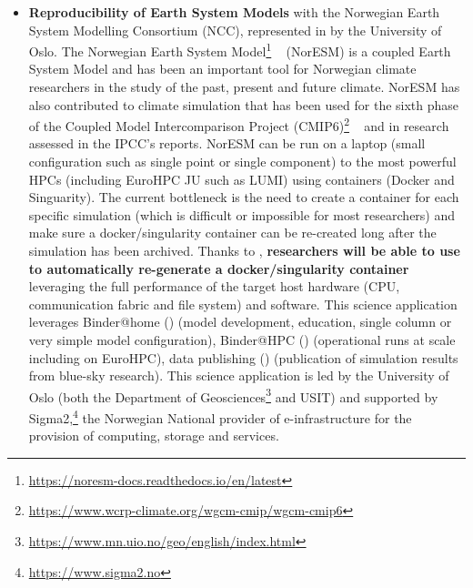 \begin{itemize}
  to increase the \textbf{reuse of enormous amounts of data} that will be made available to everyone through FAIR@UiO platform.
  FAIR@UiO is led by the University's Center for Information Technology of the University of Oslo
  (USIT\footnote{\url{https://www.usit.uio.no}}).
\item \textbf{Reproducibility of Earth System Models} with the Norwegian Earth System Modelling Consortium (NCC),
   represented in \TheProject by the University of Oslo. The Norwegian Earth System Model\footnote{\url{https://noresm-docs.readthedocs.io/en/latest}}
  ~\cite{Seland2020} (NorESM) is a coupled Earth System Model and has been an important tool for Norwegian
  climate researchers in the study of the past, present and future climate. NorESM has also contributed
  to climate simulation that has been used for the sixth phase of the Coupled Model Intercomparison Project (CMIP6)\footnote{\url{https://www.wcrp-climate.org/wgcm-cmip/wgcm-cmip6}}
   ~\cite{Seland2020} and in research assessed in the IPCC’s reports.
   NorESM can be run on a laptop (small configuration such as single
  point or single component) to the most powerful HPCs (including EuroHPC JU such as LUMI) using containers (Docker and Singuarity).
  The current bottleneck is the need to create a container for each specific
  simulation (which is difficult or impossible for most researchers) and
  make sure a docker/singularity container can be re-created long after the simulation has been archived.
  Thanks to \TheProject, \textbf{researchers will be able to use \repotodocker{} to automatically re-generate a docker/singularity container} leveraging the full performance of the target host hardware (CPU, communication fabric and file system) and software.
  This science application leverages Binder@home () (model
development, education, single column or very simple model configuration), Binder@HPC () (operational runs at scale including on EuroHPC),
data publishing  () (publication of simulation results from
blue-sky research). This science application is led by the University of Oslo (both the Department of Geosciences\footnote{\url{https://www.mn.uio.no/geo/english/index.html}} and USIT)
and supported by Sigma2,\footnote{\url{https://www.sigma2.no}} the Norwegian National
provider of e-infrastructure for the provision of computing, storage and
services.

\end{itemize}

